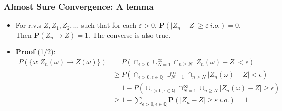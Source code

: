 \documentclass[handout]{beamer}
\newcommand{\BP}{\mathbf{P}}
\begin{document}
\frame
{
  \frametitle{Almost Sure Convergence: A lemma}

   \begin{itemize}
       \item<1->[]
       \begin{Lemma}[5.2.1] 
       For r.v.s $Z, Z_1, Z_2, \ldots $ such that for each $\varepsilon>0$, $\BP(|Z_n-Z| \geq \varepsilon \  i.o.)=0$. Then $\BP(Z_n\rightarrow Z)=1$. The converse is also true.
       \end{Lemma}       
 
 \item<2-> \textbf{Proof} (1/2):
 \begin{align*}
 P(\{ \omega : Z_n(\omega) \rightarrow Z(\omega) \} ) 
 &= P(\cap_{\epsilon > 0} \cup_{N=1}^\infty \cap_{n \ge N} |Z_n(\omega) - Z| < \epsilon  ) \\
 &\ge P(\cap_{\epsilon > 0, \epsilon \in \mathbb{Q}} \cup_{N=1}^\infty \cap_{n \ge N} |Z_n(\omega) - Z| < \epsilon  ) \\
 &= 1 - P(\cup_{\epsilon > 0, \epsilon \in \mathbb{Q}} \cap_{N=1}^\infty \cup_{n \ge N} |Z_n(\omega) - Z| \ge \epsilon  ) \\
 &\ge 1 - \sum_{\epsilon > 0, \epsilon \in \mathbb{Q}} \BP(|Z_n-Z| \geq \varepsilon \  i.o.) = 1
 \end{align*}
    

\end{itemize}}
\end{document}

